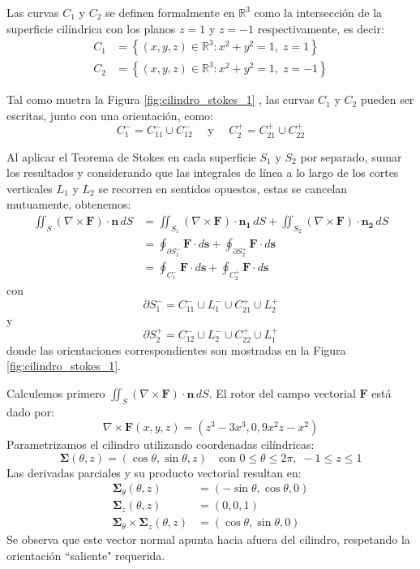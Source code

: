 Las curvas $C_1$ y $C_2$ se definen formalmente en $\mathbb{R}^3$ como la intersección de la superficie cilíndrica con los planos $z = 1$ y $z = -1$ respectivamente, es decir:
\begin{align*}
C_1 &= \left\{ (x, y, z) \in \mathbb{R}^3 : x^2 + y^2 = 1, \; z = 1 \right\} \\[1ex]
C_2 &= \left\{ (x, y, z) \in \mathbb{R}^3 : x^2 + y^2 = 1, \; z = -1 \right\}
\end{align*}

Tal como muetra la Figura \ref{fig:cilindro_stokes_1} , las curvas $C_1$ y $C_2$  pueden ser escritas, junto con una  orientaci\'on,  como:   $$ C_1^{-} = C_{11}^{-} \cup  C_{12}^{-} \quad  \text{ y } \quad   C_2^{+} = C_{21}^{+} \cup C_{22}^{+}$$  

Al aplicar el Teorema de Stokes en cada superficie $S_1$ y $S_2$  por separado, sumar los resultados y considerando que las integrales de línea a lo largo de los cortes verticales $L_1$ y  $L_2$   se recorren en sentidos opuestos, estas se cancelan mutuamente,  obtenemos:
\begin{align*}
\iint_{S} (\nabla \times \mathbf{F}) \cdot \mathbf{n}\, dS &= \iint_{S_1} (\nabla \times \mathbf{F}) \cdot \mathbf{n_1}\, dS + \iint_{S_2} (\nabla \times \mathbf{F}) \cdot \mathbf{n_2}\, dS \\[1ex]
&= \oint_{\partial S_1^{-}} \mathbf{F} \cdot d\mathbf{s} + \oint_{\partial S_2^{+}} \mathbf{F} \cdot d\mathbf{s} \\[1ex]
&= \oint_{C_1^{-}} \mathbf{F} \cdot d\mathbf{s} + \oint_{C_2^{+}} \mathbf{F} \cdot d\mathbf{s}
\end{align*}
con  $$ \partial S_1^{-} = C_{11}^{-} \cup L_1^{-}  \cup   C_{21}^{+}   \cup  L_2^{+} $$ y $$ \partial S_2^{+} = C_{12}^{-} \cup L_2^{-}  \cup   C_{22}^{+}   \cup  L_1^{+} $$  
donde las orientaciones correspondientes son mostradas en la Figura  \ref{fig:cilindro_stokes_1}.  

Calculemos primero $\iint_{S} (\nabla \times \mathbf{F}) \cdot \mathbf{n}\, dS$.   El rotor del campo vectorial $\mathbf{F}$ está dado por: 
\[
\nabla \times \mathbf{F}(x,y,z) = (z^3 - 3x^3, 0, 9x^2z - x^2)
\]
Parametrizamos el cilindro utilizando coordenadas cilíndricas:  
\[
\boldsymbol{\Sigma}(\theta, z) = (\cos\theta, \sin\theta, z) \quad \text{con } 0 \le \theta \le 2\pi, \; -1 \le z \le 1
\]
Las derivadas parciales y su producto vectorial resultan en:
\begin{align*}
\boldsymbol{\Sigma}_{\theta}(\theta, z) &= (-\sin\theta, \cos\theta, 0) \\
\boldsymbol{\Sigma}_z (\theta, z) &= (0, 0, 1) \\
\boldsymbol{\Sigma}_{\theta} \times \boldsymbol{\Sigma}_z (\theta, z) &= (\cos\theta, \sin\theta, 0)
\end{align*}
Se observa que este vector normal apunta hacia afuera del cilindro, respetando la orientación  ``saliente"  requerida. 

